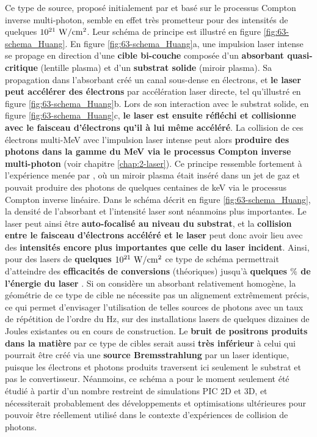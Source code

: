 \begin{refsection}
Ce type de source, proposé initialement par \cite{huang_2018} et basé sur le processus Compton inverse multi-photon, semble en effet très prometteur pour des intensités de quelques $10^{21} ~ \rm W/cm^2$. Leur schéma de principe est illustré en figure \ref{fig:63-schema_Huang}. En figure \ref{fig:63-schema_Huang}a, une impulsion laser intense se propage en direction d'une \textbf{cible bi-couche} composée d'un \textbf{absorbant quasi-critique} (lentille plasma) et d'un \textbf{substrat solide} (miroir plasma). Sa propagation dans l'absorbant créé un canal sous-dense en électrons, et \textbf{le laser peut accélérer des électrons} par accélération laser directe, tel qu'illustré en figure \ref{fig:63-schema_Huang}b. Lors de son interaction avec le substrat solide, en figure \ref{fig:63-schema_Huang}c, \textbf{le laser est ensuite réfléchi et collisionne avec le faisceau d'électrons qu'il à lui même accéléré}. La collision de ces électrons multi-MeV avec l'impulsion laser intense peut alors \textbf{produire des photons dans la gamme du MeV via le processus Compton inverse multi-photon} (voir chapitre \ref{chap:2-laser}). Ce principe ressemble fortement à l'expérience menée par \cite{phuoc_2012}, où un miroir plasma était inséré dans un jet de gaz et pouvait produire des photons de quelques centaines de keV via le processus Compton inverse linéaire. Dans le schéma décrit en figure \ref{fig:63-schema_Huang}, la densité de l'absorbant et l'intensité laser sont néanmoins plus importantes. Le laser peut ainsi être \textbf{auto-focalisé au niveau du substrat}, et la \textbf{collision entre le faisceau d'électrons accéléré et le laser} peut donc avoir lieu avec des \textbf{intensités encore plus importantes que celle du laser incident}. Ainsi, pour des lasers de \textbf{quelques $10^{21} ~ \rm W/cm^2$} ce type de schéma permettrait d'atteindre des \textbf{efficacités de conversions} (théoriques) jusqu’à \textbf{quelques $\%$ de l'énergie du laser} \parencite{huang_2018, huang_2019}. Si on considère un absorbant relativement homogène, la géométrie de ce type de cible ne nécessite pas un alignement extrêmement précis, ce qui permet d'envisager l'utilisation de telles sources de photons avec un taux de répétition de l'ordre du Hz, sur des installations lasers de quelques dizaines de Joules existantes ou en cours de construction. Le \textbf{bruit de positrons produits dans la matière} par ce type de cibles serait aussi \textbf{très inférieur} à celui qui pourrait être créé via une \textbf{source Bremsstrahlung} par un laser identique, puisque les électrons et photons produits traversent ici seulement le substrat et pas le convertisseur. Néanmoins, ce schéma a pour le moment seulement été étudié à partir d'un nombre restreint de simulations PIC 2D et 3D, et nécessiterait probablement des développements et optimisations ultérieures pour pouvoir être réellement utilisé dans le contexte d'expériences de collision de photons.


\end{refsection}
